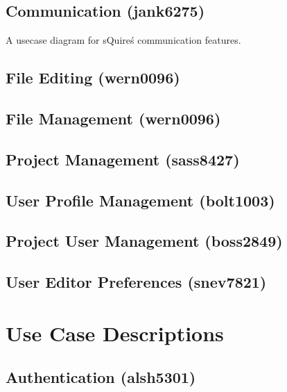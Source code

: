 \documentclass[11pt]{report}
\begin{document}
\subsection{Communication (jank6275)}
A usecase diagram for sQuire\'s communication features.

\subsection{File Editing (wern0096)}

\subsection{File Management (wern0096)}

\subsection{Project Management (sass8427)}

\subsection{User Profile Management (bolt1003)}

\subsection{Project User Management (boss2849)} 

\subsection{User Editor Preferences (snev7821)}



\section{Use Case Descriptions}

\subsection{Authentication (alsh5301)}
\end{document}

